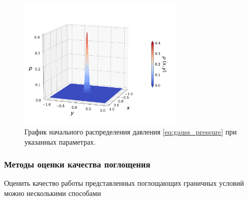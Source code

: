 \begin{figure}[H]
    \centering
    \includegraphics[trim={0pt 45pt 0pt 70pt},clip,width=0.7\textwidth]{images/pml/gauss_wavelet.png}
    \caption{График начального распределения давления  \eqref{eq:gauss_pressure} при указанных параметрах.}
    \label{fig:gauss_plot}
\end{figure}

\subsubsection{Методы оценки качества поглощения}

Оценить качество работы представленных поглощающих граничных условий можно несколькими способами

